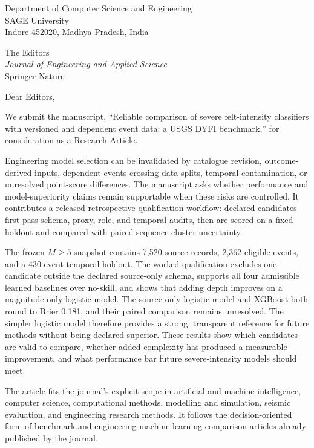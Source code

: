 \documentclass[10pt]{article}
\begin{document}
\raggedright

\begin{flushright}
Department of Computer Science and Engineering\\
SAGE University\\
Indore 452020, Madhya Pradesh, India
\end{flushright}

The Editors\\
\emph{Journal of Engineering and Applied Science}\\
Springer Nature

\medskip
Dear Editors,

We submit the manuscript, ``Reliable comparison of severe felt-intensity
classifiers with versioned and dependent event data: a USGS DYFI benchmark,''
for consideration as a Research Article.

Engineering model selection can be invalidated by catalogue revision,
outcome-derived inputs, dependent events crossing data splits, temporal
contamination, or unresolved point-score differences. The manuscript asks
whether performance and model-superiority claims remain supportable when these
risks are controlled. It contributes a released retrospective qualification
workflow: declared candidates first pass schema, proxy, role, and temporal audits, then are scored
on a fixed holdout and compared with paired sequence-cluster uncertainty.

The frozen \(M\geq5\) snapshot contains 7,520 source records, 2,362 eligible
events, and a 430-event temporal holdout. The worked qualification excludes one
candidate outside the declared source-only schema, supports all four admissible learned baselines over
no-skill, and shows that adding depth improves on a magnitude-only logistic
model. The source-only logistic model and XGBoost both round to Brier 0.181,
and their paired comparison remains
unresolved. The simpler logistic model therefore provides a strong, transparent
reference for future methods without being declared superior. These results
show which candidates are valid to compare, whether added complexity has
produced a measurable improvement, and what performance bar future
severe-intensity models should meet.

The article fits the journal's explicit scope in artificial and machine
intelligence, computer science, computational methods, modelling and simulation,
seismic evaluation, and engineering research methods. It follows the
decision-oriented form of benchmark and engineering machine-learning comparison
articles already published by the journal.
\end{document}
